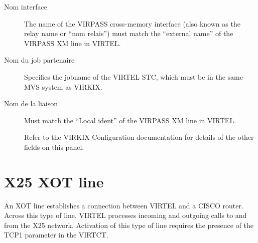 \documentclass[letterpaper,10pt,english]{sphinxmanual}
\begin{document}
\begin{description}
\item[{Nom interface}] \leavevmode
The name of the VIRPASS cross-memory interface (also known as the
relay name or “nom relais”) must match the “external name” of the
VIRPASS XM line in VIRTEL.

\item[{Nom du job partenaire}] \leavevmode
Specifies the jobname of the VIRTEL STC, which must be in the same
MVS system as VIRKIX.

\item[{Nom de la liaison}] \leavevmode
Must match the “Local ident” of the VIRPASS XM line in VIRTEL.

Refer to the VIRKIX Configuration documentation for details of the
other fields on this panel.

\end{description}

\newpage


\section{X25 XOT line}
\label{\detokenize{connectivity_guide:x25-xot-line}}\label{\detokenize{connectivity_guide:index-51}}
An XOT line establishes a connection between VIRTEL and a CISCO router. Across this type of line, VIRTEL processes incoming and outgoing calls to and from the X25 network. Activation of this type of line requires the presence of the TCP1 parameter in the VIRTCT.


\end{document}
